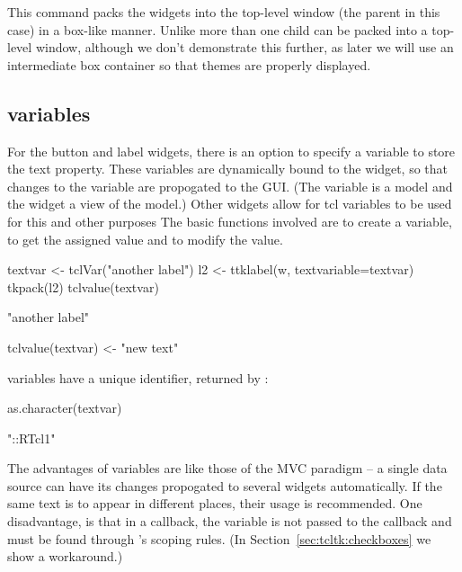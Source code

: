 This command packs the widgets into the top-level window (the parent
in this case) in a box-like manner. Unlike \GTK\/ more than one child
can be packed into a top-level window, although we don't demonstrate
this further, as later we will use an intermediate 
box container so that themes are properly displayed.

\subsection{\TCL\/ variables}
\label{sec:tcltk:overview:textvariables}


For the button and label widgets, there is an option
 to specify a \TCL\/ variable to store the text
property. These variables are dynamically bound to the widget, so that
changes to the variable are propogated to the GUI. (The \TCL\/
variable is a model and the widget a view of the model.)  Other
widgets allow for tcl variables to be used for this and other purposes
The basic functions involved are  to create a \TCL\/
variable,  to get the assigned value and
 to modify the value.

\begin{Schunk}
\begin{Sinput}
 textvar <- tclVar("another label")
 l2 <- ttklabel(w, textvariable=textvar)
 tkpack(l2)
 tclvalue(textvar)
\end{Sinput}
\begin{Soutput}
[1] "another label"
\end{Soutput}
\begin{Sinput}
 tclvalue(textvar) <- "new text"         
\end{Sinput}
\end{Schunk}

\TCL\/ variables have a unique identifier, returned by :
\begin{Schunk}
\begin{Sinput}
 as.character(textvar)
\end{Sinput}
\begin{Soutput}
[1] "::RTcl1"
\end{Soutput}
\end{Schunk}

The advantages of \TCL\/ variables are like those of the MVC paradigm
-- a single data source can have its changes propogated to several
widgets automatically. If the same text is to appear in different
places, their usage is recommended.  One disadvantage, is that in a
callback, the variable is not passed to the callback and must be found
through \R's scoping rules. (In Section~\ref{sec:tcltk:checkboxes} we
show a workaround.)


